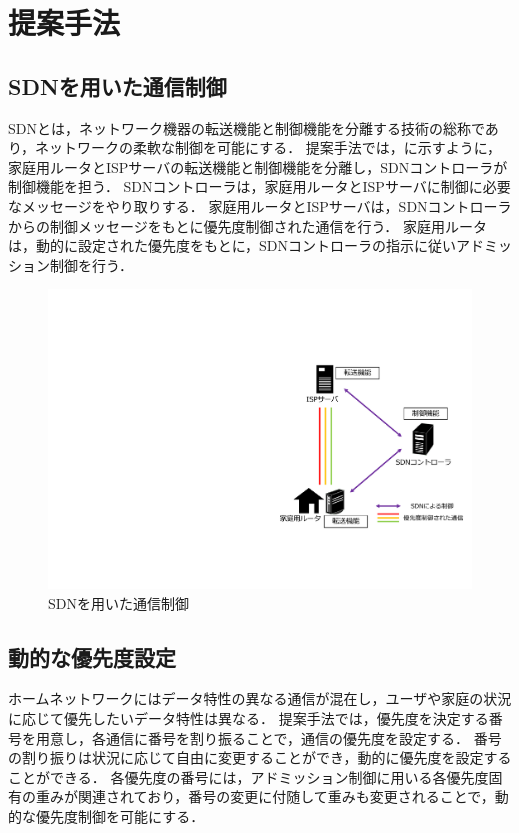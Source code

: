 \documentclass[a4paper,10pt,twocolumn,uplatex]{jsarticle}
\begin{document}
\section{提案手法}
\subsection{SDNを用いた通信制御}
SDNとは，ネットワーク機器の転送機能と制御機能を分離する技術の総称であり，ネットワークの柔軟な制御を可能にする．
提案手法では，に示すように，家庭用ルータとISPサーバの転送機能と制御機能を分離し，SDNコントローラが制御機能を担う．
SDNコントローラは，家庭用ルータとISPサーバに制御に必要なメッセージをやり取りする．
家庭用ルータとISPサーバは，SDNコントローラからの制御メッセージをもとに優先度制御された通信を行う．
家庭用ルータは，動的に設定された優先度をもとに，SDNコントローラの指示に従いアドミッション制御を行う．

\begin{figure}[t]
	\begin{centering}
    \includegraphics[width=0.7\linewidth]{img/proposal_resume.pdf}
    \caption{SDNを用いた通信制御}
    \label{fig:proposal}
    \end{centering}
\end{figure}

\subsection{動的な優先度設定}
\label{priority}
ホームネットワークにはデータ特性の異なる通信が混在し，ユーザや家庭の状況に応じて優先したいデータ特性は異なる．
提案手法では，優先度を決定する番号を用意し，各通信に番号を割り振ることで，通信の優先度を設定する．
番号の割り振りは状況に応じて自由に変更することができ，動的に優先度を設定することができる．
各優先度の番号には，アドミッション制御に用いる各優先度固有の重みが関連されており，番号の変更に付随して重みも変更されることで，動的な優先度制御を可能にする．
\end{document}
